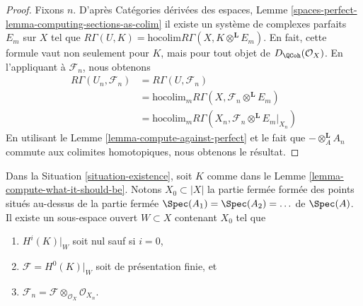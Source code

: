 \begin{proof}
Fixons $n$. D'après Catégories dérivées des espaces, Lemme
\ref{spaces-perfect-lemma-computing-sections-as-colim}
il existe un système de complexes parfaits $E_m$
sur $X$ tel que
$R\Gamma(U, K) = \text{hocolim} R\Gamma(X, K \otimes^\mathbf{L} E_m)$.
En fait, cette formule vaut non seulement pour $K$, mais pour tout objet de
$D_\QCoh(\mathcal{O}_X)$.
En l'appliquant à $\mathcal{F}_n$,
nous obtenons
\begin{align*}
R\Gamma(U_n, \mathcal{F}_n)
& =
R\Gamma(U, \mathcal{F}_n) \\
& =
\text{hocolim}_m R\Gamma(X, \mathcal{F}_n \otimes^\mathbf{L} E_m) \\
& =
\text{hocolim}_m R\Gamma(X_n, \mathcal{F}_n \otimes^\mathbf{L} E_m|_{X_n})
\end{align*}
En utilisant le Lemme \ref{lemma-compute-against-perfect}
et le fait que $- \otimes_A^\mathbf{L} A_n$
commute aux colimites homotopiques, nous obtenons le résultat.
\end{proof}

\begin{lemma}
\label{lemma-finitely-presented}
Dans la Situation \ref{situation-existence}, soit $K$ comme dans le
Lemme \ref{lemma-compute-what-it-should-be}.
Notons $X_0 \subset |X|$ la partie fermée
formée des points situés au-dessus de la partie fermée
$\Spec(A_1) = \Spec(A_2) = \ldots$ de $\Spec(A)$.
Il existe un sous-espace ouvert $W \subset X$ contenant $X_0$
tel que
\begin{enumerate}
\item $H^i(K)|_W$ soit nul sauf si $i = 0$,
\item $\mathcal{F} = H^0(K)|_W$ soit de présentation finie, et
\item $\mathcal{F}_n = \mathcal{F} \otimes_{\mathcal{O}_X} \mathcal{O}_{X_n}$.
\end{enumerate}
\end{lemma}

